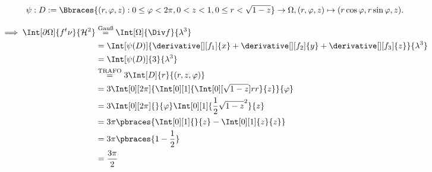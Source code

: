 \begin{solution}
\begin{align*}
    \psi:
        D := \Bbraces{(r, \varphi, z): 0 \leq \varphi < 2 \pi, 0 < z < 1, 0 \leq r < \sqrt{1 - z}} \to \Omega,
        (r, \varphi, z) \mapsto (r \cos \varphi, r \sin \varphi, z).
\end{align*}

\begin{align*}
    \implies
    \Int[\partial \Omega]
    {
        f^t \nu
    }{
        \mathcal H^2
    }
    & \stackrel
    {
        \text{Gauß}
    }{=}
    \Int[\Omega]
    {
        \Div f
    }{\lambda^3} \\
    & =
    \Int[\psi(D)]
    {
        \derivative[][f_1]{x}
        +
        \derivative[][f_2]{y}
        +
        \derivative[][f_3]{z}
    }{
        \lambda^3
    } \\
    & =
    \Int[\psi(D)]
    {
        3
    }{
        \lambda^3
    } \\
    & \stackrel
    {
        \text{TRAFO}
    }{=}
    3
    \Int[D]{r}{(r, z, \varphi)} \\
    & =
    3
    \Int[0][2 \pi]
    {
        \Int[0][1]
        {
            \Int[0][\sqrt{1 - z}]
            {
                r
            }{r}
        }{z}
    }{\varphi} \\
    & =
    3
    \Int[0][2 \pi] {}{\varphi}
    \Int[0][1]
    {
        \frac{1}{2}
        \sqrt{1 - z}^2
    }{z} \\
    & =
    3 \pi
    \pbraces
    {
        \Int[0][1]{}{z}
        -
        \Int[0][1]{z}{z}
    } \\
    & =
    3 \pi
    \pbraces
    {
        1 - \frac{1}{2}
    } \\
    & =
    \frac{3 \pi}{2}
\end{align*}

\end{solution}


